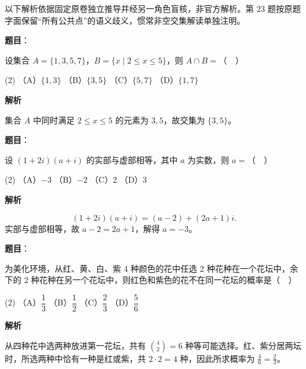 

\begin{gktip}
以下解析依据固定原卷独立推导并经另一角色盲核，非官方解析。第 23 题按原题字面保留“所有公共点”的语义歧义，惯常非空交集解读单独注明。
\end{gktip}


\begin{answer}

\textbf{题目}：

设集合 \(A=\{1,3,5,7\}\)，\(B=\{x\mid 2\leq x\leq 5\}\)，则 \(A\cap B=\)（　）

\begin{gkopts}(2)
\task （A）\(\{1,3\}\)
\task （B）\(\{3,5\}\)
\task （C）\(\{5,7\}\)
\task （D）\(\{1,7\}\)
\end{gkopts}

\textbf{解析}

集合 \(A\) 中同时满足 \(2\le x\le5\) 的元素为 \(3,5\)，故交集为 \(\{3,5\}\)。


\end{answer}
\begin{answer}

\textbf{题目}：

设 \((1+2i)(a+i)\) 的实部与虚部相等，其中 \(a\) 为实数，则 \(a=\)（　）

\begin{gkopts}(2)
\task （A）\(-3\)
\task （B）\(-2\)
\task （C）\(2\)
\task （D）\(3\)
\end{gkopts}

\textbf{解析}

\nopagebreak[4]
\[
(1+2i)(a+i)=(a-2)+(2a+1)i.
\]
实部与虚部相等，故 \(a-2=2a+1\)，解得 \(a=-3\)。


\end{answer}
\begin{answer}

\textbf{题目}：

为美化环境，从红、黄、白、紫 4 种颜色的花中任选 2 种花种在一个花坛中，余下的 2 种花种在另一个花坛中，则红色和紫色的花不在同一花坛的概率是（　）

\begin{gkopts}(2)
\task （A）\(\dfrac{1}{3}\)
\task （B）\(\dfrac{1}{2}\)
\task （C）\(\dfrac{2}{3}\)
\task （D）\(\dfrac{5}{6}\)
\end{gkopts}

\textbf{解析}

从四种花中选两种放进第一花坛，共有 \(\binom42=6\) 种等可能选择。红、紫分居两坛时，所选两种中恰有一种是红或紫，共 \(2\cdot2=4\) 种，因此所求概率为 \(\frac46=\frac23\)。


\end{answer}
